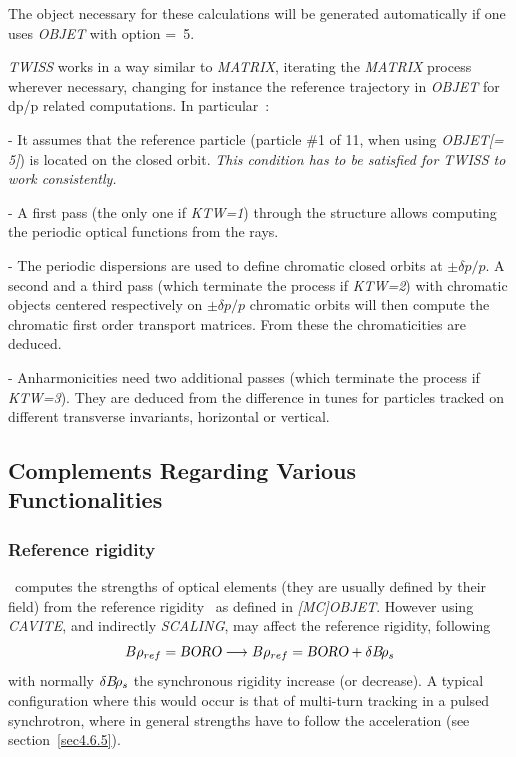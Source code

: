 \medskip 

\noindent  The object necessary for these calculations 
  will be generated automatically if one uses \textsl{OBJET}  with
option \mbox{\KOBJ= 5}.   

 \medskip 

\noindent \textsl{TWISS} works in a way similar to \textsl{MATRIX}, iterating the \textsl{MATRIX} process wherever necessary, 
changing for instance the reference trajectory in \textsl{OBJET} for dp/p related computations. 
\noindent In particular~: 

\medskip

- It assumes that the reference particle (particle \#1 of 11, when using \textsl{OBJET[\KOBJ= 5]}) is located on 
the closed orbit. \textsl{This condition has to be satisfied for TWISS to work consistently. }   

- A first pass (the only one if \textsl{KTW=1}) through the structure allows computing the periodic 
optical functions  from the  rays.

- The periodic dispersions  are used to define chromatic closed orbits at $\pm \delta p / p$. A second and a third pass 
(which terminate the process if \textsl{KTW=2}) with 
chromatic objects centered respectively  on $\pm \delta p / p$ chromatic orbits will then compute the chromatic 
first order transport matrices. From these the chromaticities are deduced. 

- Anharmonicities need two additional passes (which terminate the process if \textsl{KTW=3}). 
They are deduced from the difference in tunes for particles 
tracked on different transverse invariants, horizontal or vertical. 



\newpage




\subsection{Complements Regarding Various Functionalities} \label{sec4.6}  


\subsubsection{Reference rigidity}  \label{sec4.6.RefBORO} 

\zgoubi\ computes the strengths of optical elements (they are usually defined by their field) from the reference 
rigidity \BORO\ as defined in \textsl{[MC]OBJET}. However using \textsl{CAVITE}, and indirectly \textsl{SCALING},  
may affect the reference rigidity, following 
$$B\rho_{ref} = \textsl{BORO} \longrightarrow B\rho_{ref} = \textsl{BORO} + \delta B\!\rho_s$$ 
\noindent with normally $\delta B\!\rho_s$ the synchronous rigidity increase (or decrease). A typical configuration where this would 
occur is that of multi-turn tracking  
in a pulsed synchrotron, where in general strengths have to follow the  
acceleration (see section~\ref{sec4.6.5}). 



